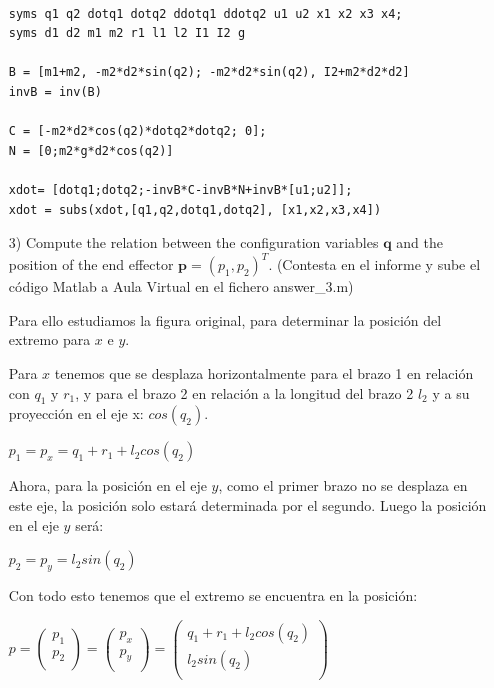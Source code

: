 \documentclass[a4paper]{article}
\begin{document}
\begin{itemize}
\bigskip

\begin{tcolorbox}[width=12cm, title={File \texttt{answer\_2.m}}]
\begin{scriptsize}
\begin{verbatim}

syms q1 q2 dotq1 dotq2 ddotq1 ddotq2 u1 u2 x1 x2 x3 x4;
syms d1 d2 m1 m2 r1 l1 l2 I1 I2 g

B = [m1+m2, -m2*d2*sin(q2); -m2*d2*sin(q2), I2+m2*d2*d2]
invB = inv(B)

C = [-m2*d2*cos(q2)*dotq2*dotq2; 0];
N = [0;m2*g*d2*cos(q2)]

xdot= [dotq1;dotq2;-invB*C-invB*N+invB*[u1;u2]];
xdot = subs(xdot,[q1,q2,dotq1,dotq2], [x1,x2,x3,x4])

\end{verbatim}
\end{scriptsize}
\end{tcolorbox}


\item[3)]
 {\color{gray} Compute the relation between the configuration variables 
$\mathbf{q}$ and the position of the end effector $\mathbf{p} = (p_1, p_2)^T$. (Contesta en el informe y sube el c\'odigo Matlab a Aula Virtual en el fichero answer\_3.m)}

\bigskip

Para ello estudiamos la figura original, para determinar la posición del extremo para $x$ e $y$.

Para $x$ tenemos que se desplaza horizontalmente para el brazo 1 en relación con $q_{1}$ y $r_{1}$, y para el brazo 2 en relación a la longitud del brazo 2 $l_{2}$ y a su proyección en el eje x: $cos(q_{2})$.

\begin{center}
	$p_{1} = p_{x} = q_{1} + r_{1} + l_{2}cos(q_{2})$
\end{center}

Ahora, para la posición en el eje $y$, como el primer brazo no se desplaza en este eje, la posición solo estará determinada por el segundo. Luego la posición en el eje $y$ será:

\begin{center}
	$p_{2} = p_{y} = l_{2}sin(q_{2})$
\end{center}

Con todo esto tenemos que el extremo se encuentra en la posición:

\begin{center}
	$p = \begin{pmatrix}
		p_{1}\\       
		p_{2}\\       
	\end{pmatrix} = \begin{pmatrix}
		p_{x}\\       
		p_{y}\\       
	\end{pmatrix} = \begin{pmatrix}
		q_{1} + r_{1} + l_{2}cos(q_{2})\\       
		l_{2}sin(q_{2})\\       
	\end{pmatrix}$
\end{center}


\end{itemize}
\end{document}
